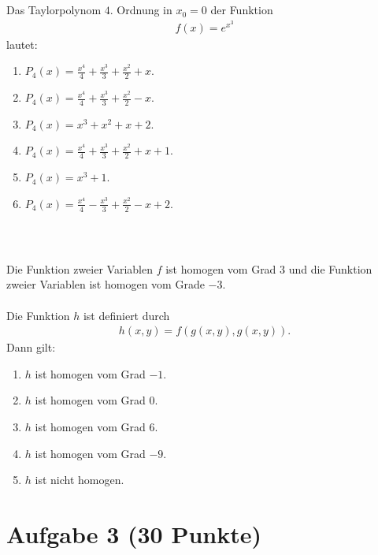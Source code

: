 \subsection*{}
Das Taylorpolynom $ 4 $. Ordnung in $ x_0 = 0 $ der Funktion
\begin{align*}
	f(x) = e^{x^3}
\end{align*}
lautet:
\renewcommand{\labelenumi}{(\alph{enumi})}
\begin{enumerate}
	\item 
	$ P_4(x) = \frac{x^4}{4} + \frac{x^3}{3} + \frac{x^2}{2} + x $. 
	\item
	$ P_4(x) = \frac{x^4}{4} + \frac{x^3}{3} + \frac{x^2}{2} - x $. 
	\item
	$ P_4(x) = x^3 + x^2 + x + 2$. 
	\item
	$ P_4(x) = \frac{x^4}{4} + \frac{x^3}{3} + \frac{x^2}{2} + x +1 $. 
	\item
	$ P_4(x) = x^3 + 1$. 
	\item
	$ P_4(x) = \frac{x^4}{4} - \frac{x^3}{3} + \frac{x^2}{2} - x + 2 $. 
\end{enumerate}
\ \\
\subsection*{}
Die Funktion zweier Variablen $ f $ ist homogen vom Grad $ 3 $ und die Funktion zweier Variablen ist homogen vom Grade $ -3 $.\\
\\
Die Funktion $ h $ ist definiert durch
\begin{align*}
	h(x,y) = f(g(x,y),g(x,y)).
\end{align*}
Dann gilt:
\renewcommand{\labelenumi}{(\alph{enumi})}
\begin{enumerate}
	\item 
	$ h $ ist homogen vom Grad $ -1 $. 
	\item
	$ h $ ist homogen vom Grad $ 0 $. 
	\item
	$ h $ ist homogen vom Grad $ 6 $. 
	\item
	$ h $ ist homogen vom Grad $ -9 $.  
	\item
	$ h $ ist nicht homogen.
\end{enumerate}

\newpage
\section*{Aufgabe 3 (30 Punkte)}
\vspace{0.4cm}

